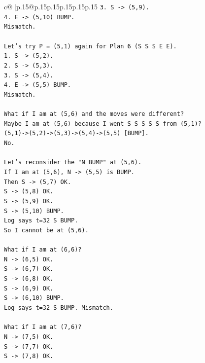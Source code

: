\documentclass{article}
\begin{document}
{\begin{supertabular}{c@{$\;$}|p{.15\linewidth}@{}p{.15\linewidth}p{.15\linewidth}p{.15\linewidth}p{.15\linewidth}p{.15\linewidth}}
{{{\texttt{3. S {-}> (5,9).} \\
\texttt{4. E {-}> (5,10) BUMP.} \\
\texttt{Mismatch.} \\
\\ 
\texttt{Let's try P = (5,1) again for Plan 6 (S S S E E).} \\
\texttt{1. S {-}> (5,2).} \\
\texttt{2. S {-}> (5,3).} \\
\texttt{3. S {-}> (5,4).} \\
\texttt{4. E {-}> (5,5) BUMP.} \\
\texttt{Mismatch.} \\
\\ 
\texttt{What if I am at (5,6) and the moves were different?} \\
\texttt{Maybe I am at (5,6) because I went S S S S S from (5,1)?} \\
\texttt{(5,1){-}>(5,2){-}>(5,3){-}>(5,4){-}>(5,5) {[}BUMP{]}.} \\
\texttt{No.} \\
\\ 
\texttt{Let's reconsider the "N BUMP" at (5,6).} \\
\texttt{If I am at (5,6), N {-}> (5,5) is BUMP.} \\
\texttt{Then S {-}> (5,7) OK.} \\
\texttt{S {-}> (5,8) OK.} \\
\texttt{S {-}> (5,9) OK.} \\
\texttt{S {-}> (5,10) BUMP.} \\
\texttt{Log says t=32 S BUMP.} \\
\texttt{So I cannot be at (5,6).} \\
\\ 
\texttt{What if I am at (6,6)?} \\
\texttt{N {-}> (6,5) OK.} \\
\texttt{S {-}> (6,7) OK.} \\
\texttt{S {-}> (6,8) OK.} \\
\texttt{S {-}> (6,9) OK.} \\
\texttt{S {-}> (6,10) BUMP.} \\
\texttt{Log says t=32 S BUMP. Mismatch.} \\
\\ 
\texttt{What if I am at (7,6)?} \\
\texttt{N {-}> (7,5) OK.} \\
\texttt{S {-}> (7,7) OK.} \\
\texttt{S {-}> (7,8) OK.} \\
}}}
\end{supertabular}}
\end{document}
